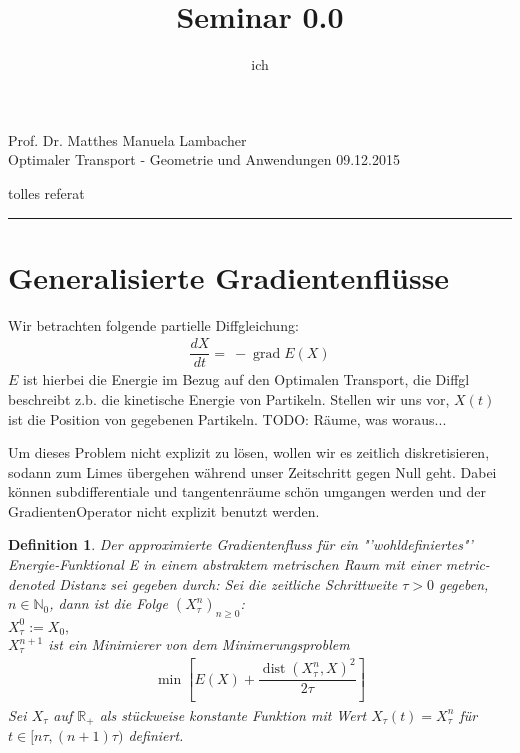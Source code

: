 \documentclass[11pt,a4paper,notitlepage]{scrreprt}
\author{ich}
\title{Seminar 0.0}
\newcommand{\RR}{\mathbb{R}}
\newcommand{\NN}{\mathbb{N}}
\newcommand{\dist}{\operatorname{dist}}
\newcommand{\grad}{\operatorname{grad}}
\newtheorem{defi}{Definition}[section]
\begin{document}
\parindent 0pt



\pagestyle{plain}



 Prof. Dr. Matthes \hfill Manuela Lambacher\\
 Optimaler Transport - Geometrie und Anwendungen \hfill 09.12.2015
 \begin{center}
  {\huge{tolles referat}} 
 \end{center}
 
 \hrule
 
\renewcommand{\thechapter}{\arabic{section}}
\renewcommand{\thesection}{\arabic{section}}
\section{Generalisierte Gradientenflüsse}

Wir betrachten folgende partielle Diffgleichung: 
\begin{eqnarray}
\dfrac{dX}{dt}=~-\grad E(X) \label{eq1}
\end{eqnarray}
$E$ ist hierbei die Energie im Bezug auf den Optimalen Transport, die Diffgl beschreibt z.b. die kinetische Energie von Partikeln. 
Stellen wir uns vor, $X(t)$ ist die Position von gegebenen Partikeln.
TODO: Räume, was woraus... 
\newline

Um dieses Problem nicht explizit zu lösen, wollen wir es zeitlich diskretisieren, sodann zum Limes übergehen während unser Zeitschritt gegen Null geht. Dabei können subdifferentiale und tangentenräume schön umgangen werden und der GradientenOperator nicht explizit benutzt werden.

\begin{defi}
Der approximierte Gradientenfluss für ein "'wohldefiniertes"' Energie-Funktional E in einem abstraktem metrischen Raum mit einer metric-denoted Distanz sei gegeben durch:
\newline
Sei die zeitliche Schrittweite $\tau > 0$ gegeben, $n\in\NN_0$, dann ist die Folge $\left( X^n_\tau \right)_{n\geq 0}$:
\\
$X_\tau^0:=X_0,$
\\
$X_\tau^{n+1}$ ist ein Minimierer von dem Minimerungsproblem
\begin{eqnarray}
\min\left[E(X)+\dfrac{\dist(X_\tau^n,X)^2}{2\tau}\right] \label{Min}
\end{eqnarray}
Sei $X_\tau$ auf $\RR_+$ als stückweise konstante Funktion mit Wert $X_\tau(t)=X^n_\tau$ für $t\in [n\tau,(n+1)\tau)$ definiert.
\end{defi}
\end{document}
